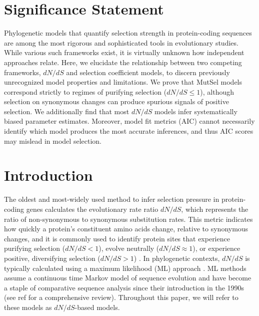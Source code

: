 \documentclass{pnastwo}
\begin{document}
\begin{article}
\bigskip

\section*{Significance Statement} 
Phylogenetic models that quantify selection strength in protein-coding sequences are among the most rigorous and sophisticated tools in evolutionary studies. While various such frameworks exist, it is virtually unknown how independent approaches relate. Here, we elucidate the relationship between two competing frameworks, $dN/dS$ and selection coefficient models, to discern previously unrecognized model properties and limitations. We prove that MutSel models correspond strictly to regimes of purifying selection ($dN/dS \leq 1$), although selection on synonymous changes can produce spurious signals of positive selection. We additionally find that most $dN/dS$ models infer systematically biased parameter estimates. Moreover, model fit metrics (AIC) cannot necessarily identify which model produces the most accurate inferences, and thus AIC scores may mislead in model selection. %

\bigskip 



\section*{Introduction}
		
The oldest and most-widely used method to infer selection pressure in protein-coding genes calculates the evolutionary rate ratio $dN/dS$, which represents the ratio of non-synonymous to synonymous substitution rates. This metric indicates how quickly a protein's constituent amino acids change, relative to synonymous changes, and it is commonly used to identify protein sites that experience purifying selection ($dN/dS<1$), evolve neutrally ($dN/dS\approx1$), or experience positive, diversifying selection ($dN/dS>1$) \cite{NielsenYang1998, Yangetal2000, KosakovskyPondFrost2005b, Huelsenbecketal2006}. In phylogenetic contexts, $dN/dS$ is typically calculated using a maximum likelihood (ML) approach \cite{GoldmanYang1994,MuseGaut1994,NielsenYang1998,Yang2006}. ML methods assume a continuous time Markov model of sequence evolution and have become a staple of comparative sequence analysis since their introduction in the 1990s (see ref \cite{Anisimova2009} for a comprehensive review). Throughout this paper, we will refer to these models as $dN/dS$-based models.


\end{article}
\end{document}
